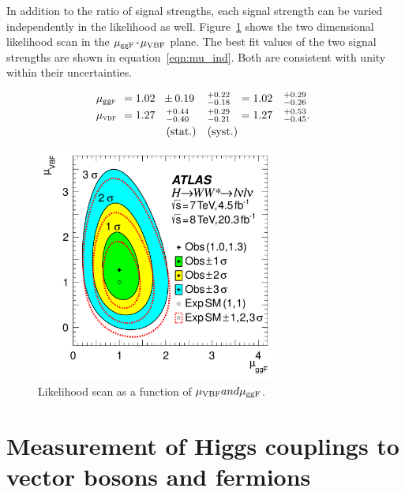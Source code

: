 In addition to the ratio of signal strengths, each signal strength can be varied independently in the likelihood as well. Figure~\ref{fig:mu_2d} shows the two dimensional likelihood scan in the $\mu_{{\rm ggF}}$-$\mu_{{\rm VBF}}$ plane. The best fit values of the two signal strengths are shown in equation~\ref{eqn:mu_ind}. Both are consistent with unity within their uncertainties. 


\begin{equation}
\begin{array}{llllll}
\no\mu_{\scggF}\no&=1.02\no&{\PM}0.19           \np&^{+0.22}_{-0.18}\np&=1.02&^{+0.29}_{-0.26} \\ \clineskip
\no\mu_{\scVX} \no&=1.27\no&\,\,^{+0.44}_{-0.40}\np&^{+0.29}_{-0.21}\np&=1.27&^{+0.53}_{-0.45}.\\ \clineskip
                     &        & ~\textrm{(stat.)}     &\textrm{(syst.)}\np
\end{array}
\label{eqn:mu_ind}
\end{equation}


\begin{figure}[h!]
  \centering
  \captionsetup{justification=centering}

  \includegraphics[width=0.7\textwidth]{figures/WW_muind}
  \caption{Likelihood scan as a function of $\mu_{{\rm VBF}} and \mu_{{\rm ggF}}$\cite{WW2015}.}
  \label{fig:mu_2d}
\end{figure}

\section{Measurement of Higgs couplings to vector bosons and fermions}

